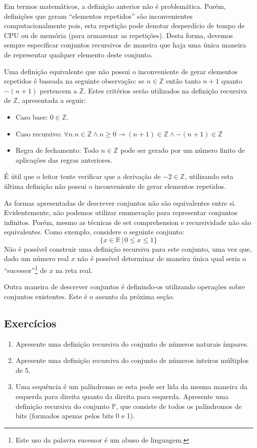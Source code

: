 \begin{Example}
Em termos matemáticos, a definição anterior não é problemática. Porém,
definições que geram ``elementos repetidos'' são inconvenientes
computacionalmente pois, esta repetição pode denotar desperdício de
tempo de CPU ou de memória (para armazenar as repetições). Desta
forma, devemos sempre especificar conjuntos recursivos de maneira que
haja uma única maneira de representar qualquer elemento deste conjunto.

Uma definição equivalente que não possui o inconveniente de gerar
elementos repetidos é baseada na seguinte observação:
se $n\in\mathbb{Z}$ então tanto $n + 1$ quanto $-(n + 1)$
pertencem a $\mathbb{Z}$. Estes critérios serão utilizados na
definição recursiva de $\mathbb{Z}$, apresentada a seguir:
\begin{itemize}
  \item Caso base: $0\in\mathbb{Z}$.
  \item Caso recursivo: $\forall n. n\in\mathbb{Z}\land n\geq 0 \to (n
    + 1) \in \mathbb{Z} \land -(n + 1) \in\mathbb{Z}$
  \item Regra de fechamento: Todo $n\in\mathbb{Z}$ pode ser gerado por
    um número finito de aplicações das regras anteriores.
\end{itemize}
É útil que o leitor tente verificar que a derivação de
$-2\in\mathbb{Z}$, utilizando esta última definição não possui o
inconveniente de gerar elementos repetidos.
\end{Example}

As formas apresentadas de descrever conjuntos não são equivalentes
entre si. Evidentemente, não podemos utilizar enumeração para
representar conjuntos infinitos. Porém, mesmo as técnicas de set
comprehension e recursividade não são equivalentes. Como exemplo,
considere o seguinte conjunto:
\[\{x\in\mathbb{R}\,|\,0 \leq x \leq 1\}\]
Não é possível construir uma definição recursiva para este conjunto,
uma vez que, dado um número real $x$ não é possível determinar de
maneira única qual seria o ``sucessor''\footnote{Este uso da palavra
  sucessor é um abuso de linguagem.} de $x$ na reta real.

Outra maneira de descrever conjuntos é definindo-os utilizando
operações sobre conjuntos existentes. Este é o assunto da próxima
seção.

\subsection{Exercícios}

\begin{enumerate}
  \item Apresente uma definição recursiva do conjunto de números naturais
    ímpares.
  \item Apresente uma definição recursiva do conjunto de números
    inteiros múltiplos de 5.
  \item Uma sequência é um palíndromo se esta pode ser lida da mesma
    maneira da esquerda para direita quanto da direita para
    esquerda. Apresente uma definição recursiva do conjunto
    $\mathbb{P}$, que consiste de todos os palíndromos de bits
  (formados apenas pelos bits 0 e 1).
\end{enumerate}

